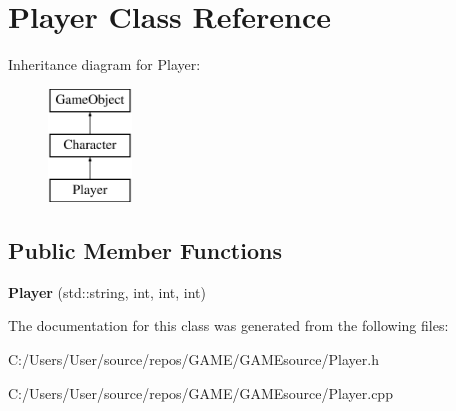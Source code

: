\hypertarget{class_player}{}\section{Player Class Reference}
\label{class_player}
Inheritance diagram for Player\+:\begin{figure}[H]
\begin{center}
\leavevmode
\includegraphics[height=3.000000cm]{class_player}
\end{center}
\end{figure}
\subsection*{Public Member Functions}
\begin{DoxyCompactItemize}
\item 
\mbox{\label{class_player_abeb2eee0f7cf8bdd9ebbe6d1fb7d7641}} 
{\bfseries Player} (std\+::string, int, int, int)
\end{DoxyCompactItemize}


The documentation for this class was generated from the following files\+:\begin{DoxyCompactItemize}
\item 
C\+:/\+Users/\+User/source/repos/\+G\+A\+M\+E/\+G\+A\+M\+Esource/Player.\+h\item 
C\+:/\+Users/\+User/source/repos/\+G\+A\+M\+E/\+G\+A\+M\+Esource/Player.\+cpp\end{DoxyCompactItemize}
